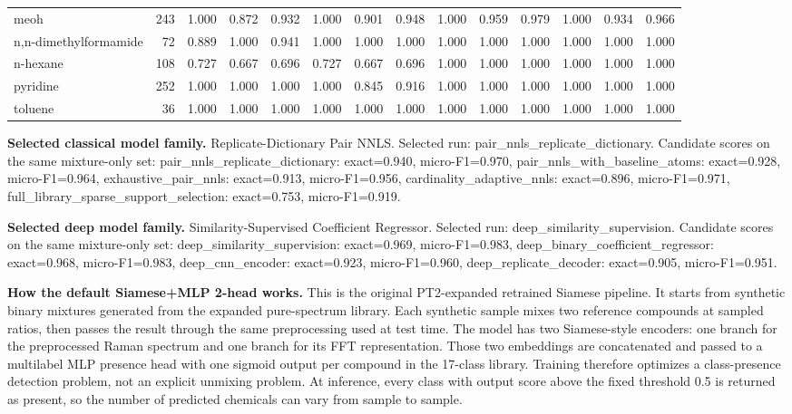 \documentclass[11pt]{article}
\begin{document}
\begin{landscape}
\begin{center}
\begin{longtable}{lrrrrrrrrrrrrr}
        meoh & 243 & 1.000 & 0.872 & 0.932 & 1.000 & 0.901 & 0.948 & 1.000 & 0.959 & 0.979 & 1.000 & 0.934 & 0.966 \\
        n,n-dimethylformamide & 72 & 0.889 & 1.000 & 0.941 & 1.000 & 1.000 & 1.000 & 1.000 & 1.000 & 1.000 & 1.000 & 1.000 & 1.000 \\
        n-hexane & 108 & 0.727 & 0.667 & 0.696 & 0.727 & 0.667 & 0.696 & 1.000 & 1.000 & 1.000 & 1.000 & 1.000 & 1.000 \\
        pyridine & 252 & 1.000 & 1.000 & 1.000 & 1.000 & 0.845 & 0.916 & 1.000 & 1.000 & 1.000 & 1.000 & 1.000 & 1.000 \\
        toluene & 36 & 1.000 & 1.000 & 1.000 & 1.000 & 1.000 & 1.000 & 1.000 & 1.000 & 1.000 & 1.000 & 1.000 & 1.000 \\
\bottomrule
\end{longtable}
\end{center}
\end{landscape}

\textbf{Selected classical model family.} Replicate-Dictionary Pair NNLS. Selected run: pair\_nnls\_replicate\_dictionary. Candidate scores on the same mixture-only set: pair\_nnls\_replicate\_dictionary: exact=0.940, micro-F1=0.970, pair\_nnls\_with\_baseline\_atoms: exact=0.928, micro-F1=0.964, exhaustive\_pair\_nnls: exact=0.913, micro-F1=0.956, cardinality\_adaptive\_nnls: exact=0.896, micro-F1=0.971, full\_library\_sparse\_support\_selection: exact=0.753, micro-F1=0.919.

\textbf{Selected deep model family.} Similarity-Supervised Coefficient Regressor. Selected run: deep\_similarity\_supervision. Candidate scores on the same mixture-only set: deep\_similarity\_supervision: exact=0.969, micro-F1=0.983, deep\_binary\_coefficient\_regressor: exact=0.968, micro-F1=0.983, deep\_cnn\_encoder: exact=0.923, micro-F1=0.960, deep\_replicate\_decoder: exact=0.905, micro-F1=0.951.

\textbf{How the default Siamese+MLP 2-head works.} This is the original PT2-expanded retrained Siamese pipeline. It starts from synthetic binary mixtures generated from the expanded pure-spectrum library. Each synthetic sample mixes two reference compounds at sampled ratios, then passes the result through the same preprocessing used at test time. The model has two Siamese-style encoders: one branch for the preprocessed Raman spectrum and one branch for its FFT representation. Those two embeddings are concatenated and passed to a multilabel MLP presence head with one sigmoid output per compound in the 17-class library. Training therefore optimizes a class-presence detection problem, not an explicit unmixing problem. At inference, every class with output score above the fixed threshold 0.5 is returned as present, so the number of predicted chemicals can vary from sample to sample.
\end{document}
